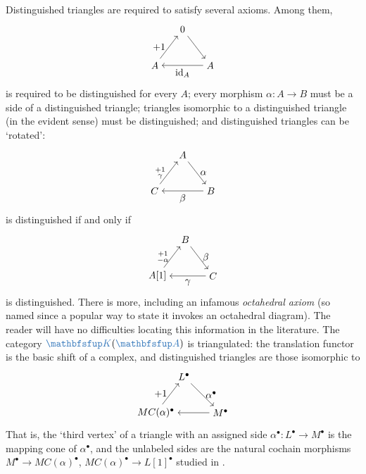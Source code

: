 Distinguished triangles are required to satisfy several axioms.  Among
them,
\[
  \begin{tikzpicture}[baseline=(current bounding box.center)]
    \node (T) at (1,1.3) {$0$}; \node (C) at (0,0)
    {$A$}; \node (B) at (2,0)
    {$A$}; \draw[->] (T) -- (B); \draw[->] (B) -- (C) node[midway,
    below] {$\id_A$}; \draw[->] (C) -- (T) node[midway, left] {$+1$};
  \end{tikzpicture}
\]
is required to be distinguished for every $A$; every morphism
$\alpha : A \to B$ must be a side of a distinguished triangle;
triangles isomorphic to a distinguished triangle (in the evident
sense) must be distinguished; and distinguished triangles can be
`rotated':
\[
  \begin{tikzpicture}[baseline=(current bounding box.center)]
    \node (A) at (1,1.3) {$A$}; \node (C) at (0,0)
    {$C$}; \node (B) at (2,0)
    {$B$}; \draw[->] (A) -- (B) node[midway, right]
    {$\alpha$}; \draw[->] (B) -- (C) node[midway, below]
    {$\beta$}; \draw[->] (C) -- (A) node[midway, left]
    {$\substack{+1\\\gamma}$};
  \end{tikzpicture}
\]
is distinguished if and only if
\[
  \begin{tikzpicture}[baseline=(current bounding box.center)]
    \node (B) at (1,1.3) {$B$}; \node (A) at (0,0)
    {$A[1]$}; \node (C) at (2,0)
    {$C$}; \draw[->] (B) -- (C) node[midway, right]
    {$\beta$}; \draw[->] (C) -- (A) node[midway, below]
    {$\gamma$}; \draw[->] (A) -- (B) node[midway, left]
    {$\substack{+1\\-\alpha}$};
  \end{tikzpicture}
\]
is distinguished. There is more, including an infamous
\emph{octahedral axiom} (so named since a popular way to state it
invokes an octahedral diagram). The reader will have no difficulties
locating this information in the literature.  The category
$\categ{K}(\categ{A})$ is triangulated: the translation functor is the
basic shift of a complex, and distinguished triangles are those
isomorphic to
\[
  \begin{tikzpicture}[baseline=(current bounding box.center)]
    \node (L) at (1,1.3)
    {$L^\bullet$}; \node (MC) at (0,0)
    {$MC(\alpha)^\bullet$}; \node (M) at (2.3,0)
    {$M^\bullet$}; \draw[->] (L) -- (M) node[midway, right]
    {$\alpha^\bullet$}; \draw[->] (M) -- (MC); \draw[->] (MC) -- (L)
    node[midway, left] {$+1$};
  \end{tikzpicture}
\]
That is, the `third vertex' of a triangle with an assigned side
$\alpha^\bullet : L^\bullet \to M^\bullet$ is the mapping cone of
$\alpha^\bullet$, and the unlabeled sides are the natural cochain
morphisms $M^\bullet \to MC(\alpha)^\bullet$,
$MC(\alpha)^\bullet \to L[1]^\bullet$ studied in
.


